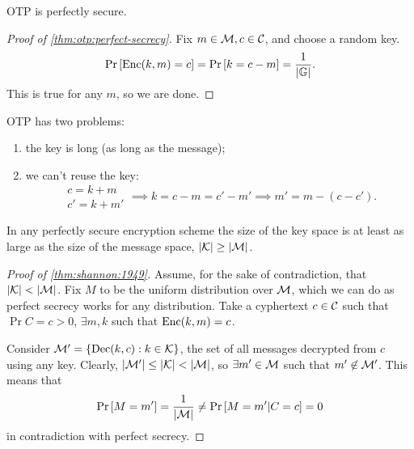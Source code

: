 \begin{theorem} \label{thm:otp:perfect-secrecy}
	\ac{OTP} is perfectly secure.
\end{theorem}

\begin{proof}[Proof of \cref{thm:otp:perfect-secrecy}]
	Fix $m \in \mathcal{M}, c \in \mathcal{C}$, and choose a random key.
	\begin{equation*}
		\mathop{\mathrm{Pr}}\limits_{} \left[ {\mathrm{Enc}(k,m) = c} \right] = \mathop{\mathrm{Pr}}\limits_{} \left[ {k = c - m} \right] = \frac{1}{\left|{\mathbb{G}}\right|}.
	\end{equation*}
	This is true for any $m$, so we are done.
\end{proof}

\ac{OTP} has two problems:
\begin{enumerate}
	\item the key is long (as long as the message);
	\item we can't reuse the key:
	\begin{equation*}
		\begin{array}{c}
			c = k + m \\
			c' = k + m'
		\end{array}
		\implies
		k = c - m = c' - m'
		\implies
		m' = m - (c - c').
	\end{equation*}
\end{enumerate}

\begin{theorem}[Shannon, 1949] \label{thm:shannon:1949}
	In any perfectly secure encryption scheme the size of the key space is at least as large as the size of the message space, \ie $\left|{\mathcal{K}}\right| \ge \left|{\mathcal{M}}\right|$.
\end{theorem}

\begin{proof}[Proof of \cref{thm:shannon:1949}]
	Assume, for the sake of contradiction, that $\left|{\mathcal{K}}\right| < \left|{\mathcal{M}}\right|$.
	Fix $M$ to be the uniform distribution over $\mathcal{M}$, which we can do as perfect secrecy works for any distribution.
	Take a cyphertext $c \in \mathcal{C}$ such that $\Pr{C = c} > 0$, \ie $\exists m, k$ such that $\mathrm{Enc}(k,m) = c$.

	Consider $\mathcal{M}' = \{ \mathrm{Dec}(k,c) : k \in \mathcal{K} \}$, the set of all messages decrypted from $c$ using any key.
	Clearly, $\left|{\mathcal{M}'}\right| \le \left|{\mathcal{K}}\right| < \left|{\mathcal{M}}\right|$, so $\exists m' \in \mathcal{M}$ such that $m' \not\in \mathcal{M}'$.
	This means that
	\begin{equation*}
		\mathop{\mathrm{Pr}}\limits_{} \left[ {M = m'} \right] = \frac{1}{\left|{\mathcal{M}}\right|} \neq \mathop{\mathrm{Pr}}\limits_{} \left[ {M = m' | C = c} \right] = 0
	\end{equation*}
	in contradiction with perfect secrecy.
\end{proof}

